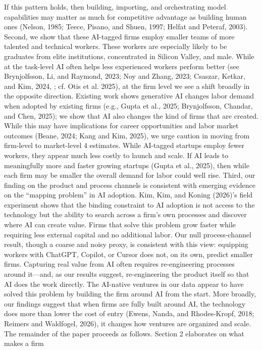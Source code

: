 If this pattern holds, then building, importing, and orchestrating model capabilities may matter as
much for competitive advantage as building human ones (Nelson, 1985; Teece, Pisano, and Shuen,
1997; Helfat and Peteraf, 2003).
Second, we show that these AI-tagged firms employ smaller teams of more talented and technical
workers. These workers are especially likely to be graduates from elite institutions, concentrated in
Silicon Valley, and male. While at the task-level AI often helps less experienced workers perform
better (see Brynjolfsson, Li, and Raymond, 2023; Noy and Zhang, 2023; Csaszar, Ketkar, and Kim,
2024, ; cf. Otis et al. 2025), at the firm level we see a shift broadly in the opposite direction. Existing
work shows generative AI changes labor demand when adopted by existing firms (e.g., Gupta et al.,
2025; Brynjolfsson, Chandar, and Chen, 2025); we show that AI also changes the kind of firms that
are created. While this may have implications for career opportunities and labor market outcomes
(Beane, 2024; Kang and Kim, 2025), we urge caution in moving from firm-level to market-level
4
estimates. While AI-tagged startups employ fewer workers, they appear much less costly to launch
and scale. If AI leads to meaningfully more and faster growing startups (Gupta et al., 2025), then
while each firm may be smaller the overall demand for labor could well rise.
Third, our finding on the product and process channels is consistent with emerging evidence on
the “mapping problem” in AI adoption. Kim, Kim, and Koning (2026)’s field experiment shows that
the binding constraint to AI adoption is not access to the technology but the ability to search across
a firm’s own processes and discover where AI can create value. Firms that solve this problem grow
faster while requiring less external capital and no additional labor. Our null process-channel result,
though a coarse and noisy proxy, is consistent with this view: equipping workers with ChatGPT,
Copilot, or Cursor does not, on its own, predict smaller firms. Capturing real value from AI often
requires re-engineering processes around it—and, as our results suggest, re-engineering the product
itself so that AI does the work directly. The AI-native ventures in our data appear to have solved
this problem by building the firm around AI from the start. More broadly, our findings suggest
that when firms are fully built around AI, the technology does more than lower the cost of entry
(Ewens, Nanda, and Rhodes-Kropf, 2018; Reimers and Waldfogel, 2026), it changes how ventures
are organized and scale.
The remainder of the paper proceeds as follows. Section 2 elaborates on what makes a firm
